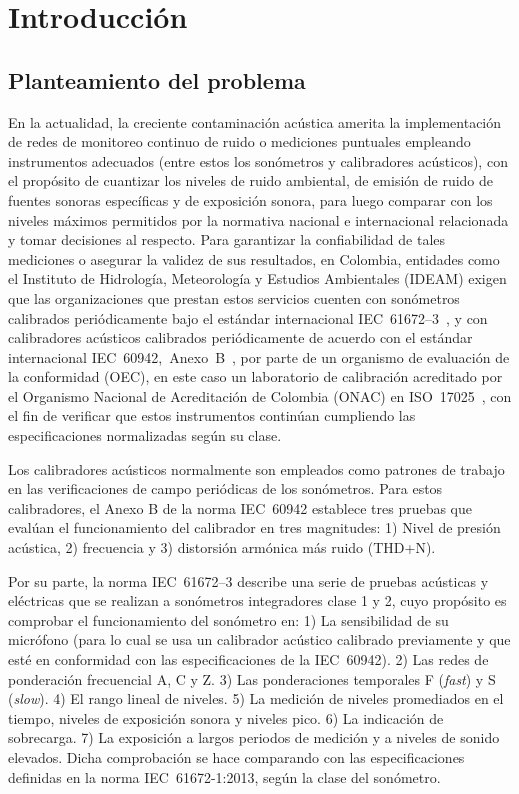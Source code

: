 \chapter{Introducción}

\section{Planteamiento del problema}
En la actualidad, la creciente contaminación acústica amerita la implementación de redes de monitoreo continuo de ruido
o mediciones puntuales empleando instrumentos adecuados (entre estos los sonómetros y calibradores acústicos), con el
propósito de cuantizar los niveles de ruido ambiental, de emisión de ruido de fuentes sonoras específicas y de
exposición sonora, para luego comparar con los niveles máximos permitidos por la normativa nacional e internacional
relacionada y tomar decisiones al respecto.
Para garantizar la confiabilidad de tales mediciones o asegurar la validez de sus resultados, en Colombia, entidades
como el Instituto de Hidrología, Meteorología y Estudios Ambientales (IDEAM) exigen que las organizaciones que prestan
estos servicios cuenten con sonómetros calibrados periódicamente bajo el estándar internacional
\mbox{IEC 61672--3}~\citeyearpar{IEC_TC29_2013_3}, y con calibradores acústicos calibrados periódicamente de acuerdo con
el estándar internacional \mbox{IEC 60942, Anexo B}~\citeyearpar{IEC_TC29_2017}, por parte de un organismo de evaluación
de la conformidad (OEC), en este caso un laboratorio de calibración acreditado por el Organismo Nacional de Acreditación
de Colombia (ONAC) en \mbox{ISO 17025}~\citeyearpar{ISO_CASCO_2017}, con el fin de verificar que estos instrumentos
continúan cumpliendo las especificaciones normalizadas según su clase.

Los calibradores acústicos normalmente son empleados como patrones de trabajo en las verificaciones de campo periódicas
de los sonómetros.
Para estos calibradores, el Anexo B de la norma \mbox{IEC 60942} establece tres pruebas que evalúan el funcionamiento
del calibrador en tres magnitudes:
1) Nivel de presión acústica,
2) frecuencia y
3) distorsión armónica más ruido (THD+N).

Por su parte, la norma \mbox{IEC 61672--3} describe una serie de pruebas acústicas y eléctricas que se realizan a
sonómetros integradores clase 1 y 2, cuyo propósito es comprobar el funcionamiento del sonómetro en:
1) La sensibilidad de su micrófono (para lo cual se usa un calibrador acústico calibrado previamente y que esté en
conformidad con las especificaciones de la \mbox{IEC 60942}).
2) Las redes de ponderación frecuencial A, C y Z. 3) Las ponderaciones temporales F (\emph{fast}) y S (\emph{slow}).
4) El rango lineal de niveles.
5) La medición de niveles promediados en el tiempo, niveles de exposición sonora y niveles pico.
6) La indicación de sobrecarga.
7) La exposición a largos periodos de medición y a niveles de sonido elevados.
Dicha comprobación se hace comparando con las especificaciones definidas en la norma \mbox{IEC 61672-1:2013}, según la
clase del sonómetro.

